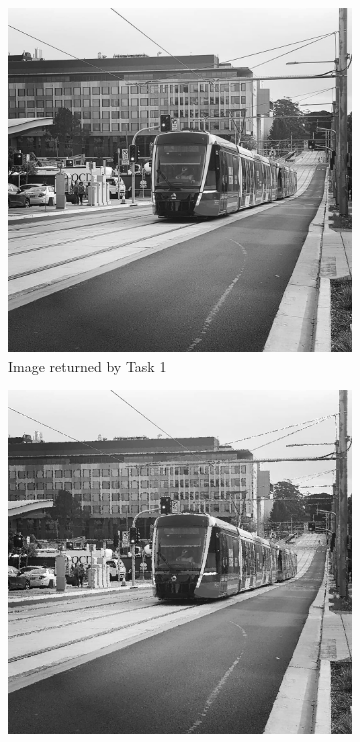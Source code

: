 \documentclass{article}
\begin{document}
\begin{figure}[!h]
  \centering
  \begin{subfigure}[b]{0.4\linewidth}
    \includegraphics[width=\linewidth]{task1_light_rail_.jpg}
    \caption{Image returned by Task 1}
  \end{subfigure}
  \begin{subfigure}[b]{0.4\linewidth}
    \includegraphics[width=\linewidth]{task2__light_rail_3.jpg}

\end{subfigure}
\end{figure}
\end{document}
